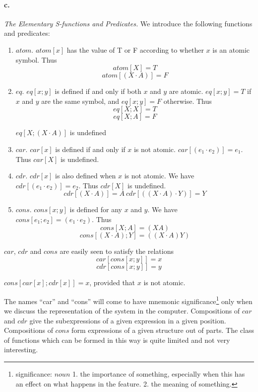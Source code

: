 \documentclass[11pt, a4paper]{article}
\begin{document}
\paragraph{c.}\textit{The Elementary S-functions and Predicates.}
We introduce the following functions and predicates:
\begin{enumerate}
\item $atom$. $atom[x]$ has the value of T or F according to whether $x$ is an
  atomic symbol. Thus
  $$ atom[X] = T $$
  $$ atom[(X \cdot A)] = F $$
\item $eq$. $eq[x; y]$ is defined if and only if both $x$ and $y$ are
  atomic. $eq[x; y] = T$ if $x$ and $y$ are the same symbol, and $eq[x; y] = F$
  otherwise. Thus
  $$ eq[X; X] = T $$
  $$ eq[X; A] = F $$
  \begin{center}$eq[X; (X \cdot A)]$ is undefined\end{center}
\item $car$. $car[x]$ is defined if and only if $x$ is not atomic. $car[(e_1
  \cdot e_2)] = e_1$. Thus $car[X]$ is undefined.
\item $cdr$. $cdr[x]$ is also defined when $x$ is not atomic. We have $cdr[(e_1
  \cdot e_2)] = e_2$. Thus $cdr[X]$ is undefined.
  $$ cdr[(X \cdot A)] = A \ cdr[((X \cdot A) \cdot Y)] = Y $$
\item $cons$. $cons[x; y]$ is defined for any $x$ and $y$. We have $cons[e_1;
  e_2] = (e_1 \cdot e_2)$. Thus
  $$ cons[X; A] = (X A) $$
  $$ cons[(X \cdot A); Y] = ((X \cdot A) Y) $$
\end{enumerate}
$car$, $cdr$ and $cons$ are easily seen to satisfy the relations
$$ car[cons[x; y]] = x $$
$$ cdr[cons[x; y]] = y $$
\begin{center}$cons[car[x]; cdr[x]] = x$, provided that $x$ is not
  atomic.\end{center}

The names ``car'' and ``cons'' will come to have mnemonic
significance\footnote{significance: $noun$ 1. the importance of something,
  especially when this has an effect on what happens in the feature. 2. the
  meaning of something.}
only when
we discuss the representation of the system in the computer. Compositions of
$car$ and $cdr$ give the subexpressions of a given expression in a given
position. Compositions of $cons$ form expressions of a given structure out of
parts. The class of functions which can be formed in this way is quite limited
and not very interesting.
\end{document}
